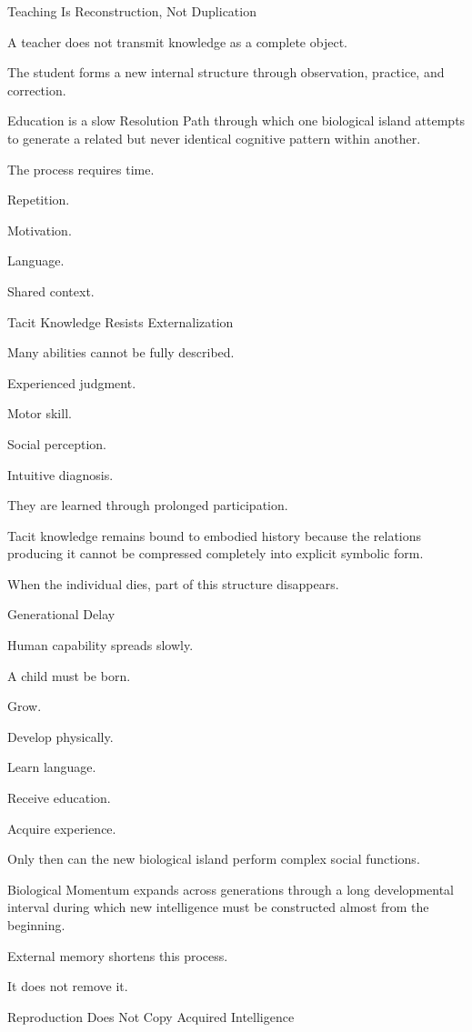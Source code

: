 Teaching Is Reconstruction, Not Duplication

A teacher does not transmit knowledge as a complete object.

The student forms a new internal structure through observation, practice, and correction.

Education is a slow Resolution Path through which one biological island attempts to generate a related but never identical cognitive pattern within another.

The process requires time.

Repetition.

Motivation.

Language.

Shared context.

Tacit Knowledge Resists Externalization

Many abilities cannot be fully described.

Experienced judgment.

Motor skill.

Social perception.

Intuitive diagnosis.

They are learned through prolonged participation.

Tacit knowledge remains bound to embodied history because the relations producing it cannot be compressed completely into explicit symbolic form.

When the individual dies, part of this structure disappears.

Generational Delay

Human capability spreads slowly.

A child must be born.

Grow.

Develop physically.

Learn language.

Receive education.

Acquire experience.

Only then can the new biological island perform complex social functions.

Biological Momentum expands across generations through a long developmental interval during which new intelligence must be constructed almost from the beginning.

External memory shortens this process.

It does not remove it.

Reproduction Does Not Copy Acquired Intelligence

